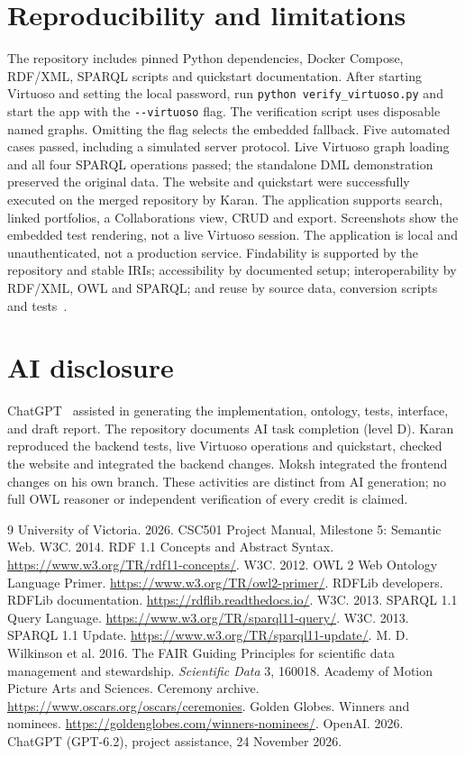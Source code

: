 \documentclass[sigconf,nonacm]{acmart}
\begin{document}
\section{Reproducibility and limitations}
The repository includes pinned Python dependencies, Docker Compose, RDF/XML, SPARQL scripts and quickstart documentation. After starting Virtuoso and setting the local password, run \texttt{python verify\_virtuoso.py} and start the app with the \texttt{-{}-virtuoso} flag. The verification script uses disposable named graphs. Omitting the flag selects the embedded fallback. Five automated cases passed, including a simulated server protocol. Live Virtuoso graph loading and all four SPARQL operations passed; the standalone DML demonstration preserved the original data. The website and quickstart were successfully executed on the merged repository by Karan. The application supports search, linked portfolios, a Collaborations view, CRUD and export. Screenshots show the embedded test rendering, not a live Virtuoso session. The application is local and unauthenticated, not a production service. Findability is supported by the repository and stable IRIs; accessibility by documented setup; interoperability by RDF/XML, OWL and SPARQL; and reuse by source data, conversion scripts and tests~\cite{fair}.
\section{AI disclosure}
ChatGPT~\cite{ai} assisted in generating the implementation, ontology, tests, interface, and draft report. The repository documents AI task completion (level D). Karan reproduced the backend tests, live Virtuoso operations and quickstart, checked the website and integrated the backend changes. Moksh integrated the frontend changes on his own branch. These activities are distinct from AI generation; no full OWL reasoner or independent verification of every credit is claimed.
\begin{thebibliography}{9}
 University of Victoria. 2026. CSC501 Project Manual, Milestone 5: Semantic Web.
 W3C. 2014. RDF 1.1 Concepts and Abstract Syntax. \url{https://www.w3.org/TR/rdf11-concepts/}.
 W3C. 2012. OWL 2 Web Ontology Language Primer. \url{https://www.w3.org/TR/owl2-primer/}.
 RDFLib developers. RDFLib documentation. \url{https://rdflib.readthedocs.io/}.
 W3C. 2013. SPARQL 1.1 Query Language. \url{https://www.w3.org/TR/sparql11-query/}.
 W3C. 2013. SPARQL 1.1 Update. \url{https://www.w3.org/TR/sparql11-update/}.
 M. D. Wilkinson et al. 2016. The FAIR Guiding Principles for scientific data management and stewardship. \textit{Scientific Data} 3, 160018.
 Academy of Motion Picture Arts and Sciences. Ceremony archive. \url{https://www.oscars.org/oscars/ceremonies}.
 Golden Globes. Winners and nominees. \url{https://goldenglobes.com/winners-nominees/}.
 OpenAI. 2026. ChatGPT (GPT-6.2), project assistance, 24 November 2026.
\end{thebibliography}
\end{document}
